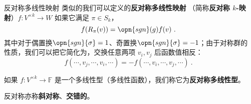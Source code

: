 \begin{definition}{反对称多线性映射}\label{def_SASmap_1}
类似的我们可以定义的\textbf{反对称多线性映射} （简称\textbf{反对称 $k$-映射}）$f: V^{\times k} \to W$ 如果它满足 $\pi \in S_k$，
\begin{equation}
f(R_\pi(v)) = \opn{sgn}(g) f(v)~.
\end{equation}
其中对于偶置换$\opn{sgn}{\sigma} = 1$、奇置换$\opn{sgn}{\sigma} = -1$；由于对称群的性质，我们可以把它简化为，交换任意两项 $v_i, v_j$ 后函数值相反：
\begin{equation}
f(\cdots, v_j, \cdots, v_i, \cdots) = - f(\cdots, v_i, \cdots, v_j, \cdots)~.
\end{equation}

如果 $f: V^{\times k} \to \mathbb{F}$ 是一个多线性型（多线性函数），我们称它为\textbf{反对称多线性型}。

反对称亦称\textbf{斜对称}、\textbf{交错的}。
\end{definition}


